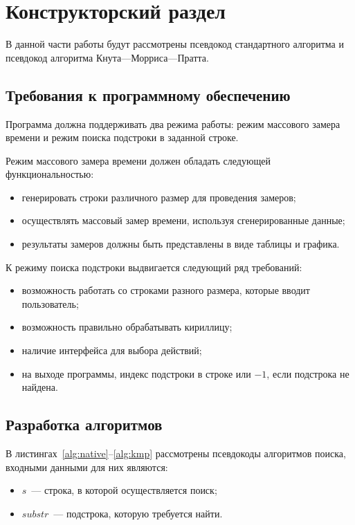 \chapter{Конструкторский раздел}

В данной части работы будут рассмотрены псевдокод стандартного алгоритма и псевдокод алгоритма Кнута---Морриса---Пратта.


\section{Требования к программному обеспечению}

Программа должна поддерживать два режима работы: режим массового замера времени и режим поиска подстроки в заданной строке.

Режим массового замера времени должен обладать следующей функциональностью:
\begin{itemize}
	\item генерировать строки различного размер для проведения замеров;
	\item осуществлять массовый замер времени, используя сгенерированные данные;
	\item результаты замеров должны быть представлены в виде таблицы и графика.
\end{itemize}	

К режиму поиска подстроки выдвигается следующий ряд требований:
\begin{itemize}
	\item возможность работать со строками разного размера, которые вводит пользователь;
	\item возможность правильно обрабатывать кириллицу;
	\item наличие интерфейса для выбора действий;
	\item на выходе программы, индекс подстроки в строке или $-1$, если подстрока не найдена.
\end{itemize}

\section{Разработка алгоритмов}

В листингах~\ref{alg:native}--\ref{alg:kmp} рассмотрены псевдокоды алгоритмов поиска, входными данными для них являются:
\begin{itemize}
	\item $s$~--- строка, в которой осуществляется поиск;
	\item $substr$~--- подстрока, которую требуется найти.
\end{itemize}

